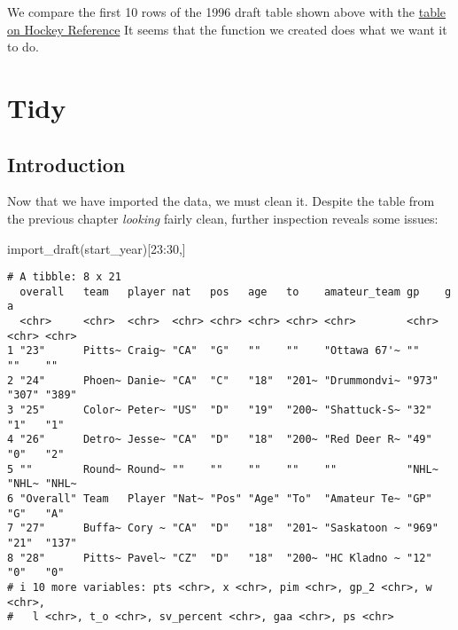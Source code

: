 \documentclass[
  letterpaper,
  DIV=11,
  numbers=noendperiod]{scrreprt}
\newenvironment{Shaded}{\begin{snugshade}}{\end{snugshade}}
\newcommand{\DecValTok}[1]{\textcolor[rgb]{0.68,0.00,0.00}{#1}}
\newcommand{\FunctionTok}[1]{\textcolor[rgb]{0.28,0.35,0.67}{#1}}
\newcommand{\NormalTok}[1]{\textcolor[rgb]{0.00,0.23,0.31}{#1}}
\newcommand{\SpecialCharTok}[1]{\textcolor[rgb]{0.37,0.37,0.37}{#1}}
\begin{document}
We compare the first 10 rows of the 1996 draft table shown above with
the
\href{https://www.hockey-reference.com/draft/NHL_1996_entry.html}{table
on Hockey Reference} It seems that the function we created does what we
want it to do.


\chapter{Tidy}\label{tidy}

\section{Introduction}\label{introduction-1}

Now that we have imported the data, we must clean it. Despite the table
from the previous chapter \emph{looking} fairly clean, further
inspection reveals some issues:

\begin{Shaded}
\begin{Highlighting}[]
\FunctionTok{import\_draft}\NormalTok{(start\_year)[}\DecValTok{23}\SpecialCharTok{:}\DecValTok{30}\NormalTok{,]}
\end{Highlighting}
\end{Shaded}

\begin{verbatim}
# A tibble: 8 x 21
  overall   team   player nat   pos   age   to    amateur_team gp    g     a    
  <chr>     <chr>  <chr>  <chr> <chr> <chr> <chr> <chr>        <chr> <chr> <chr>
1 "23"      Pitts~ Craig~ "CA"  "G"   ""    ""    "Ottawa 67'~ ""    ""    ""   
2 "24"      Phoen~ Danie~ "CA"  "C"   "18"  "201~ "Drummondvi~ "973" "307" "389"
3 "25"      Color~ Peter~ "US"  "D"   "19"  "200~ "Shattuck-S~ "32"  "1"   "1"  
4 "26"      Detro~ Jesse~ "CA"  "D"   "18"  "200~ "Red Deer R~ "49"  "0"   "2"  
5 ""        Round~ Round~ ""    ""    ""    ""    ""           "NHL~ "NHL~ "NHL~
6 "Overall" Team   Player "Nat~ "Pos" "Age" "To"  "Amateur Te~ "GP"  "G"   "A"  
7 "27"      Buffa~ Cory ~ "CA"  "D"   "18"  "201~ "Saskatoon ~ "969" "21"  "137"
8 "28"      Pitts~ Pavel~ "CZ"  "D"   "18"  "200~ "HC Kladno ~ "12"  "0"   "0"  
# i 10 more variables: pts <chr>, x <chr>, pim <chr>, gp_2 <chr>, w <chr>,
#   l <chr>, t_o <chr>, sv_percent <chr>, gaa <chr>, ps <chr>
\end{verbatim}
\end{document}
